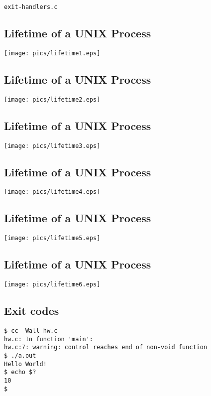 \documentclass[xga]{xdvislides}
\begin{document}
{\tt exit-handlers.c}

\subsection{Lifetime of a UNIX Process}
\begin{center}
	\texttt{[image: pics/lifetime1.eps]}
\end{center}

\subsection{Lifetime of a UNIX Process}
\begin{center}
	\texttt{[image: pics/lifetime2.eps]}
\end{center}

\subsection{Lifetime of a UNIX Process}
\begin{center}
	\texttt{[image: pics/lifetime3.eps]}
\end{center}

\subsection{Lifetime of a UNIX Process}
\begin{center}
	\texttt{[image: pics/lifetime4.eps]}
\end{center}

\subsection{Lifetime of a UNIX Process}
\begin{center}
	\texttt{[image: pics/lifetime5.eps]}
\end{center}

\subsection{Lifetime of a UNIX Process}
\begin{center}
	\texttt{[image: pics/lifetime6.eps]}
\end{center}

\subsection{Exit codes}
\begin{verbatim}
$ cc -Wall hw.c
hw.c: In function 'main':
hw.c:7: warning: control reaches end of non-void function
$ ./a.out
Hello World!
$ echo $?
10
$
\end{verbatim}
\end{document}
